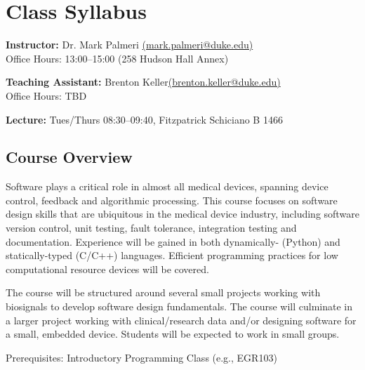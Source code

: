 



\section*{Class Syllabus}

{\bf Instructor:} Dr. Mark Palmeri \href{mailto:mark.palmeri@duke.edu}{(mark.palmeri@duke.edu)}\\
Office Hours: 13:00--15:00 (258 Hudson Hall Annex)

{\bf Teaching Assistant:} Brenton Keller\href{mailto:brenton.keller@duke.edu}{(brenton.keller@duke.edu)}\\
Office Hours: TBD

{\bf Lecture:} Tues/Thurs 08:30--09:40, Fitzpatrick Schiciano B 1466

\subsection*{Course Overview}
Software plays a critical role in almost all medical devices, spanning device control, feedback and algorithmic processing.  This course focuses on software design skills that are ubiquitous in the medical device industry, including software version control, unit testing, fault tolerance, integration testing and documentation.  Experience will be gained in both dynamically- (Python) and statically-typed (C/C++) languages.  Efficient programming practices for low computational resource devices will be covered.

The course will be structured around several small projects working with biosignals to develop software design fundamentals.  The course will culminate in a larger project working with clinical/research data and/or designing software for a small, embedded device.  Students will be expected to work in small groups.

Prerequisites: Introductory Programming Class (e.g., EGR103)

